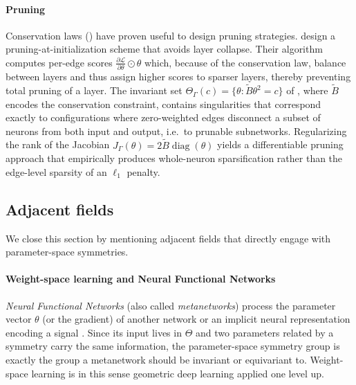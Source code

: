\documentclass[mathematics,review,submit,moreauthors]{Definitions/mdpi}
\begin{document}
\paragraph{Pruning}
Conservation laws () have proven useful to design pruning strategies.
\citet{tanaka2020anips} design a pruning-at-initialization scheme that avoids layer collapse.
Their algorithm computes per-edge scores $\frac{\partial \mathcal{L}}{\partial \theta}\odot \theta$ which, because of the conservation law, balance between layers and thus assign higher scores to sparser layers, thereby preventing total pruning of a layer.
The invariant set $\Theta_\Gamma(c)=\{\theta:\tilde{B}\theta^2=c\}$ of \citet{nurisso2025}, where $\tilde B$ encodes the conservation constraint, contains singularities that correspond exactly to configurations where zero-weighted edges disconnect a subset of neurons from both input and output, i.e.\ to prunable subnetworks.
Regularizing the rank of the Jacobian $J_\Gamma(\theta)=2\tilde{B}\operatorname{diag}(\theta)$ yields a differentiable pruning approach that empirically produces whole-neuron sparsification rather than the edge-level sparsity of an $\ell_1$ penalty.

\subsection{Adjacent fields}\label{sec:adjacent-fields}
We close this section by mentioning adjacent fields that directly engage with parameter-space symmetries.

\paragraph{Weight-space learning and Neural Functional Networks}
\emph{Neural Functional Networks} \citep{zhou2023} (also called \emph{metanetworks}) process the parameter vector $\theta$ (or the gradient) of another network or an implicit neural representation encoding a signal \citep[INR,][]{sitzmann2020anips}.
Since its input lives in $\Theta$ and two parameters related by a symmetry carry the same information, the parameter-space symmetry group is exactly the group a metanetwork should be invariant or equivariant to.
Weight-space learning is in this sense geometric deep learning applied one level up.
\end{document}
